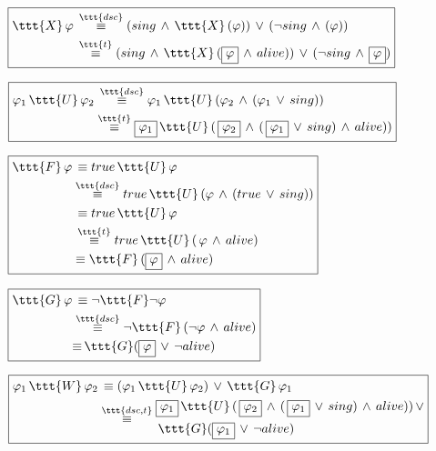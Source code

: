 \documentclass[11pt]{article}
\begin{document}
$\boxed{\begin{aligned}
            \ttt{X}\,\varphi &\,\overset{\ttt{dsc}}{\equiv} (sing\,\land\,\ttt{X}\,(\varphi))\,\lor\,(\neg sing\,\land\,(\varphi))\\
            &\,\overset{\ttt{t}}{\equiv} (sing\,\land\,\ttt{X}\,(\boxed{\varphi}\,\land\, alive))\,\lor\,(\neg sing\,\land\,\boxed{\varphi})
\end{aligned}}$

\vspace{0.25cm}

$\boxed{\begin{aligned}
            \varphi_1\,\ttt{U}\,\varphi_2 &\,\overset{\ttt{dsc}}{\equiv} \varphi_1\,\ttt{U}\,(\varphi_2\,\land\,(\varphi_1\,\lor\,sing))\\
            &\overset{\ttt{t}}{\equiv} \boxed{\varphi_1}\,\ttt{U}\,(\,\boxed{\varphi_2}\,\land\,(\,\boxed{\varphi_1}\,\lor\,sing)\,\land\,alive))
\end{aligned}}$

\vspace{0.25cm}

$\boxed{\begin{aligned}
     \ttt{F}\,\varphi &\,\equiv true\,\ttt{U}\,\varphi \\
     &\overset{\ttt{dsc}}{\equiv} true\,\ttt{U}\,(\varphi\,\land\,(true\,\lor\, sing)) \\
     &\,\equiv true\,\ttt{U}\,\varphi \\
     &\,\overset{\ttt{t}}{\equiv} true\,\ttt{U}\,(\,\varphi\,\land\,alive) \\
     & \equiv \ttt{F}\,(\boxed{\varphi}\,\land\,alive)
\end{aligned}}$

\vspace{0.25cm}

$\boxed{\begin{aligned}
      \ttt{G}\,\varphi &\,\equiv \neg \ttt{F}\neg \varphi \\
      &\overset{\ttt{dsc}}{\equiv} \neg \ttt{F}\,(\neg\varphi\,\land\,alive) \\
      &{\equiv}\, \ttt{G}(\boxed{\varphi}\,\lor\,\neg alive)
\end{aligned}}$

\vspace{0.25cm}

$\boxed{\begin{aligned}
            \varphi_1\,\ttt{W}\,\varphi_2 &\,\equiv (\varphi_1\,\ttt{U}\,\varphi_2)\,\lor\,\ttt{G}\,\varphi_1 \\
            &\overset{\ttt{dsc,t}}{\equiv} \begin{aligned}
                                          &\boxed{\varphi_1}\,\ttt{U}\,(\,\boxed{\varphi_2}\,\land\,(\,\boxed{\varphi_1}\,\lor\,sing)\,\land\,alive))\,\lor\\
                                          &\,\ttt{G}(\boxed{\varphi_1}\,\lor\,\neg alive)
            \end{aligned}
\end{aligned}}$
\end{document}
